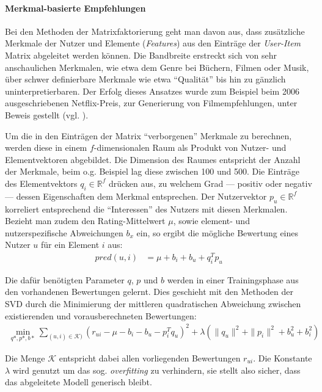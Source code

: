 \paragraph{Merkmal-basierte Empfehlungen} Bei den Methoden der Matrixfaktorierung geht man davon aus, dass zusätzliche Merkmale der Nutzer und Elemente (\textit{Features}) aus den Einträge der \textit{User-Item} Matrix abgeleitet werden können. Die Bandbreite erstreckt sich von sehr anschaulichen Merkmalen, wie etwa dem Genre bei Büchern, Filmen oder Musik, über schwer definierbare Merkmale wie etwa ``Qualität'' bis hin zu gänzlich uninterpretierbaren. Der Erfolg dieses Ansatzes wurde zum Beispiel beim 2006 ausgeschriebenen Netflix-Preis, zur Generierung von Filmempfehlungen, unter Beweis gestellt (vgl. \citep{Koren:2009:MFT:1608565.1608614}).

Um die in den Einträgen der Matrix ``verborgenen'' Merkmale zu berechnen, werden diese in einem $f$-dimensionalen Raum als Produkt von Nutzer- und Elementvektoren abgebildet. Die Dimension des Raumes entspricht der Anzahl der Merkmale, beim o.g. Beispiel lag diese zwischen 100 und 500. Die Einträge des Elementvektors $q_i \in \mathbb{R}^f$ drücken aus, zu welchem Grad --- positiv oder negativ --- dessen Eigenschaften dem Merkmal entsprechen. Der Nutzervektor $p_u \in \mathbb{R}^f$ korreliert entsprechend die ``Interessen'' des Nutzers mit diesen Merkmalen. Bezieht man zudem den Rating-Mittelwert $\mu$, sowie element- und nutzerspezifische Abweichungen $b_x$ ein, so ergibt die mögliche Bewertung eines Nutzer $u$ für ein Element $i$ aus:
\begin{align}
pred(u,i) & = \mu + b_i + b_u + q_i^T p_u \label{form:calcpredsvd}
\end{align}

Die dafür benötigten Parameter $q$, $p$ und $b$ werden in einer Trainingsphase aus den vorhandenen Bewertungen gelernt. Dies geschieht mit den Methoden der \acf{SVD}  \citep{golub65} durch die Minimierung der mittleren quadratischen Abweichung zwischen existierenden und vorausberechneten Bewertungen:
\begin{align}
\min_{q*,p*,b*}{ \sum_{(u,i) \in \mathcal{K})} (r_{ui} -\mu-b_i - b_u - p_i^T q_u)^2  + \lambda ( \|q_u\|^2 + \|p_i\|^2 + b_u^2 + b_i^2) \label{form:trainsvd}   }
\end{align}

Die Menge $\mathcal{K}$ entspricht dabei allen vorliegenden Bewertungen $r_{ui}$. Die Konstante $\lambda$ wird genutzt um das sog. \textit{overfitting} zu verhindern, sie stellt also sicher, dass das abgeleitete Modell generisch bleibt.  \citep{Koren:2009:MFT:1608565.1608614, hb_05}

